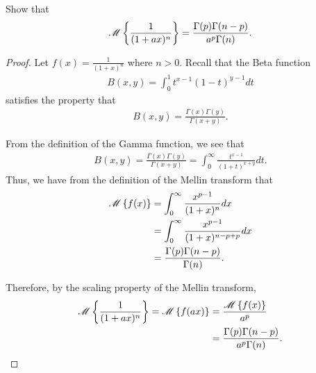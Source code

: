 \begin{problem}{8.4}
  Show that
  \begin{align*}
    \mathscr{M}\left\{ {\frac{1}{(1 + ax)^n}} \right\} = \frac{\Gamma(p)\Gamma(n-p)}{a^p \Gamma(n)}.
  \end{align*}
\end{problem}

\begin{proof}
  Let $\displaystyle f(x) = \frac{1}{(1+x)^n}$ where $n > 0$. Recall that the Beta function
  \begin{align*}
    B(x, y) = \int_0^1 t^{x-1}(1-t)^{y-1}dt
  \end{align*}
  satisfies the property that
  \begin{align*}
    B(x, y) = \frac{\Gamma(x)\Gamma(y)}{\Gamma(x+y)}.
  \end{align*}

  From the definition of the Gamma function, we see that
  \begin{align*}
    B(x, y) = \frac{\Gamma(x)\Gamma(y)}{\Gamma(x+y)} = \int_0^\infty \frac{t^{x-1}}{(1+t)^{x+y}} dt.
  \end{align*}
  Thus, we have from the definition of the Mellin transform that
  \begin{align*}
    \mathscr{M}\left\{ {f(x)} \right\} &= \int_0^\infty \frac{x^{p-1}}{(1+x)^n} dx\\
    &= \int_0^\infty \frac{x^{p-1}}{(1+x)^{n-p+p}} dx \\
    &= \frac{\Gamma(p)\Gamma(n-p)}{\Gamma(n)}.
  \end{align*}

  Therefore, by the scaling property of the Mellin transform,
  \begin{align*}
    \mathscr{M}\left\{ {\frac{1}{(1 + ax)^n}} \right\} = \mathscr{M}\left\{ {f(ax)} \right\}
    &= \frac{\mathscr{M}\left\{ {f(x)} \right\}}{a^{p}} \\
    &= \frac{\Gamma(p)\Gamma(n-p)}{a^{p}\Gamma(n)}.
  \end{align*}

\end{proof}
\newpage

